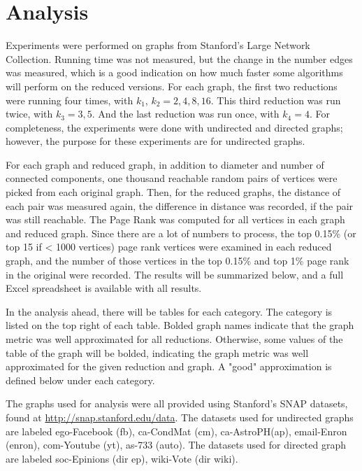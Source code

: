 \documentclass[11pt]{article}
\begin{document}
\pagebreak

\section{Analysis}
Experiments were performed on graphs from Stanford's Large Network Collection.  Running time was not measured, but the change in the number edges was measured, which is a good indication on how much faster some algorithms will perform on the reduced versions.  For each graph, the first two reductions were running four times, with $k_1$, $k_2 = 2,4,8,16$.  This third reduction was run twice, with $k_3 = 3,5$.  And the last reduction was run once, with $k_4 = 4$.  For completeness, the experiments were done with undirected and directed graphs; however, the purpose for these experiments are for undirected graphs. 

For each graph and reduced graph, in addition to diameter and number of connected components, one thousand reachable random pairs of vertices were picked from each original graph.  Then, for the reduced graphs, the distance of each pair was measured again, the difference in distance was recorded, if the pair was still reachable.  The Page Rank was computed for all vertices in each graph and reduced graph.  Since there are a lot of numbers to process, the top 0.15\% (or top 15 if < 1000 vertices) page rank vertices were examined in each reduced graph, and the number of those vertices in the top 0.15\% and top 1\% page rank in the original were recorded.  The results will be summarized below, and a full Excel spreadsheet is available with all results.

In the analysis ahead, there will be tables for each category.  The category is listed on the top right of each table.  Bolded graph names indicate that the graph metric was well approximated for all reductions.  Otherwise, some values of the table of the graph will be bolded, indicating the graph metric was well approximated for the given reduction and graph.  A "good" approximation is defined below under each category.

The graphs used for analysis were all provided using Stanford's SNAP datasets, found at \url{http://snap.stanford.edu/data}.  The datasets used for undirected graphs are labeled ego-Facebook (fb), ca-CondMat (cm), ca-AstroPH(ap), email-Enron (enron), com-Youtube (yt), as-733 (auto).  The datasets used for directed graph are labeled soc-Epinions (dir ep), wiki-Vote (dir wiki).
\end{document}
